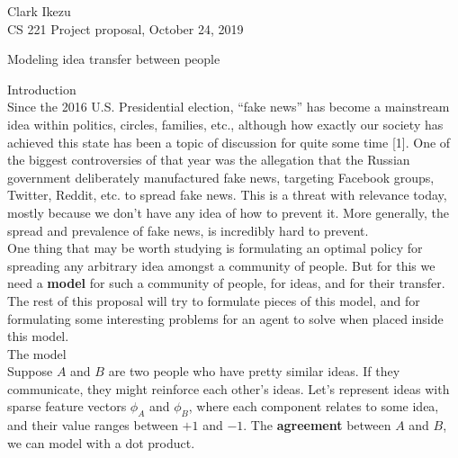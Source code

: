 \documentclass{article}
\begin{document}
\begin{flushleft}
Clark Ikezu\\
CS 221 Project proposal, October 24, 2019\\
\vspace{5pt}
\begin{center}
Modeling idea transfer between people\\
\end{center}

Introduction\\
\vspace{3pt}
Since the 2016 U.S. Presidential election, ``fake news'' has become a mainstream idea within politics, circles, families, etc., although how exactly our society has achieved this state has been a topic of discussion for quite some time [1]. One of the biggest controversies of that year was the allegation that the Russian government deliberately manufactured fake news, targeting Facebook groups, Twitter, Reddit, etc. to spread fake news. This is a threat with relevance today, mostly because we don't have any idea of how to prevent it. More generally, the spread and prevalence of fake news, is incredibly hard to prevent.\\
\vspace{10pt}
One thing that may be worth studying is formulating an optimal policy for spreading any arbitrary idea amongst a community of people. But for this we need a \textbf{model} for such a community of people, for ideas, and for their transfer. The rest of this proposal will try to formulate pieces of this model, and for formulating some interesting problems for an agent to solve when placed inside this model.\\
\vspace{10pt}
The model\\
\vspace{3pt}
Suppose $A$ and $B$ are two people who have pretty similar ideas. If they communicate, they might reinforce each other's ideas. Let's represent ideas with sparse feature vectors $\phi_A$ and $\phi_B$, where each component relates to some idea, and their value ranges between $+1$ and $-1$. The \textbf{agreement} between $A$ and $B$, we can model with a dot product.


\end{flushleft}
\end{document}
